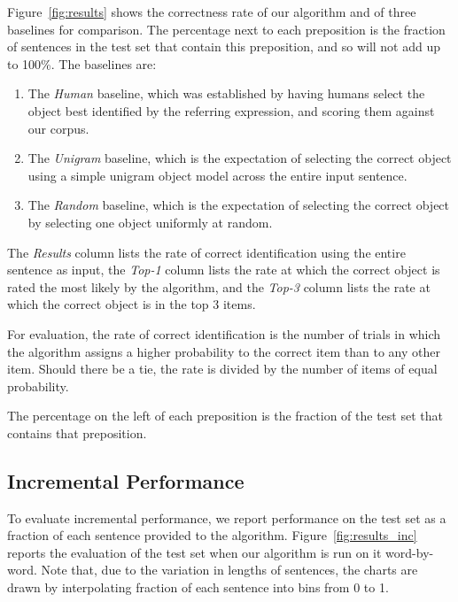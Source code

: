 \documentclass[conference]{IEEEtran}
\numberwithin{equation}{section}
\begin{document}
Figure~\ref{fig:results} shows the correctness rate of our algorithm and of three baselines for comparison. The percentage next to each preposition is the fraction of sentences in the test set that contain this preposition, and so will not add up to 100\%. The baselines are:
\begin{enumerate}[topsep=0pt,itemsep=-1ex,partopsep=1ex,parsep=1ex]
	\item The \emph{Human} baseline, which was established by having humans select the object best identified by the referring expression, and scoring them against our corpus.
	\item The \emph{Unigram} baseline, which is the expectation of selecting the correct object using a simple unigram object model across the entire input sentence.
	\item The \emph{Random} baseline, which is the expectation of selecting the correct object by selecting one object uniformly at random.
\end{enumerate}

The \emph{Results} column lists the rate of correct identification using the entire sentence as input, the \emph{Top-1} column lists the rate at which the correct object is rated the most likely by the algorithm, and the \emph{Top-3} column lists the rate at which the correct object is in the top 3 items.

For evaluation, the rate of correct identification is the number of trials in which the algorithm assigns a higher probability to the correct item than to any other item. Should there be a tie, the rate is divided by the number of items of equal probability.

The percentage on the left of each preposition is the fraction of the test set that contains that preposition.

\subsection{Incremental Performance}

To evaluate incremental performance, we report performance on the test set as a fraction of each sentence provided to the algorithm. Figure~\ref{fig:results_inc} reports the evaluation of the test set when our algorithm is run on it word-by-word. Note that, due to the variation in lengths of sentences, the charts are drawn by interpolating fraction of each sentence into bins from 0 to 1.
\end{document}

